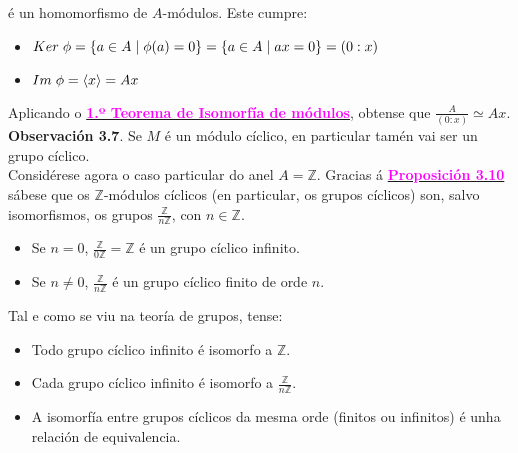 \documentclass[twoside]{report}
\newcommand{\magbf}[1]{\textcolor{magenta}{\textbf{#1}}} %
\theoremstyle{mystyle}
\begin{document}
\noindent é un homomorfismo de $A$-módulos. Este cumpre:

\begin{itemize}
    \item $Ker \hspace{1mm} \phi = \{a \in A \hspace{1mm} | \hspace{1mm} \phi(a) = 0\} = \{a \in A \hspace{1mm} | \hspace{1mm} ax = 0\} = (0 : x)$
    \item $Im \hspace{1mm} \phi = \langle x \rangle = Ax$
\end{itemize}

\noindent Aplicando o \hyperref[th3.1]{\magbf{1.º Teorema de Isomorfía de módulos}}, obtense que $\displaystyle \frac{A}{(0 : x)} \simeq Ax$.\\

\noindent \textbf{Observación 3.7}. Se $M$ é un módulo cíclico, en particular tamén vai ser un grupo cíclico.\\

\noindent Considérese agora o caso particular do anel $A = \mathbb{Z}$. Gracias á \hyperref[prop3.10]{\magbf{Proposición 3.10}} sábese que os $\mathbb{Z}$-módulos cíclicos (en particular, os grupos cíclicos) son, salvo isomorfismos, os grupos $\displaystyle \frac{\mathbb{Z}}{n\mathbb{Z}}$, con $n \in \mathbb{Z}$.
\begin{itemize}
    \item Se $n = 0$, $\displaystyle \frac{\mathbb{Z}}{0\mathbb{Z}} = \mathbb{Z}$ é un grupo cíclico infinito.
    \item Se $n \neq 0$, $\displaystyle \frac{\mathbb{Z}}{n\mathbb{Z}}$ é un grupo cíclico finito de orde $n$.
\end{itemize}

\noindent Tal e como se viu na teoría de grupos, tense:

\begin{itemize}
    \item Todo grupo cíclico infinito é isomorfo a $\mathbb{Z}$.
    \item Cada grupo cíclico infinito é isomorfo a $\displaystyle \frac{\mathbb{Z}}{n\mathbb{Z}}$.
    \item A isomorfía entre grupos cíclicos da mesma orde (finitos ou infinitos) é unha relación de equivalencia.
\end{itemize}
\end{document}
